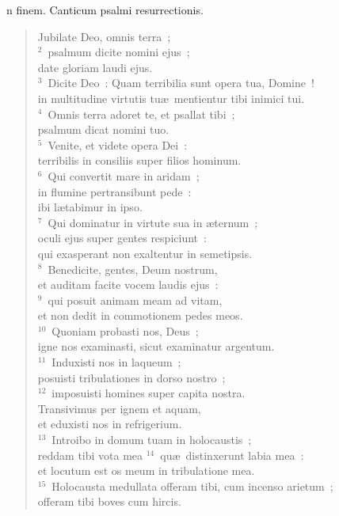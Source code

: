 \bchapter[Psalm]
n finem. Canticum psalmi resurrectionis. \begin{verse}Jubilate Deo, omnis terra~;\\
${}^{2}$~psalmum dicite nomini ejus~;\\ date gloriam laudi ejus.\\
${}^{3}$~Dicite Deo~: Quam terribilia sunt opera tua, Domine~!\\ in multitudine virtutis tu\ae\ mentientur tibi inimici tui.\\
${}^{4}$~Omnis terra adoret te, et psallat tibi~;\\ psalmum dicat nomini tuo.\\
${}^{5}$~Venite, et videte opera Dei~:\\ terribilis in consiliis super filios hominum.\\
${}^{6}$~Qui convertit mare in aridam~;\\ in flumine pertransibunt pede~:\\ ibi l\ae tabimur in ipso.\\
${}^{7}$~Qui dominatur in virtute sua in \ae ternum~;\\ oculi ejus super gentes respiciunt~:\\ qui exasperant non exaltentur in semetipsis.\\
${}^{8}$~Benedicite, gentes, Deum nostrum,\\ et auditam facite vocem laudis ejus~:\\
${}^{9}$~qui posuit animam meam ad vitam,\\ et non dedit in commotionem pedes meos.\\
${}^{10}$~Quoniam probasti nos, Deus~;\\ igne nos examinasti, sicut examinatur argentum.\\
${}^{11}$~Induxisti nos in laqueum~;\\ posuisti tribulationes in dorso nostro~;\\
${}^{12}$~imposuisti homines super capita nostra.\\ Transivimus per ignem et aquam,\\ et eduxisti nos in refrigerium.\\
${}^{13}$~Introibo in domum tuam in holocaustis~;\\ reddam tibi vota mea
${}^{14}$~qu\ae\ distinxerunt labia mea~:\\ et locutum est os meum in tribulatione mea.\\
${}^{15}$~Holocausta medullata offeram tibi, cum incenso arietum~;\\ offeram tibi boves cum hircis.\\

\end{verse}
